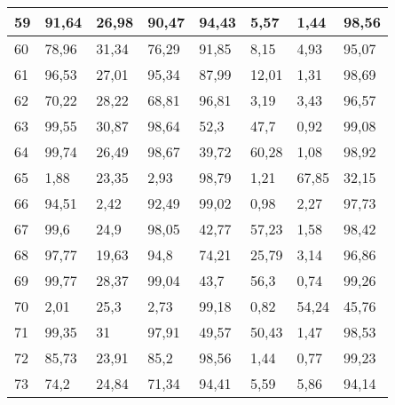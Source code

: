 \begin{longtable}[c]{|l|l|l|l|l|l|l|l|}
59              & 91,64        & 26,98        & 90,47       & 94,43         & 5,57          & 1,44          & 98,56         \\ \hline
60              & 78,96        & 31,34        & 76,29       & 91,85         & 8,15          & 4,93          & 95,07         \\ \hline
61              & 96,53        & 27,01        & 95,34       & 87,99         & 12,01         & 1,31          & 98,69         \\ \hline
62              & 70,22        & 28,22        & 68,81       & 96,81         & 3,19          & 3,43          & 96,57         \\ \hline
63              & 99,55        & 30,87        & 98,64       & 52,3          & 47,7          & 0,92          & 99,08         \\ \hline
64              & 99,74        & 26,49        & 98,67       & 39,72         & 60,28         & 1,08          & 98,92         \\ \hline
65              & 1,88         & 23,35        & 2,93        & 98,79         & 1,21          & 67,85         & 32,15         \\ \hline
66              & 94,51        & 2,42         & 92,49       & 99,02         & 0,98          & 2,27          & 97,73         \\ \hline
67              & 99,6         & 24,9         & 98,05       & 42,77         & 57,23         & 1,58          & 98,42         \\ \hline
68              & 97,77        & 19,63        & 94,8        & 74,21         & 25,79         & 3,14          & 96,86         \\ \hline
69              & 99,77        & 28,37        & 99,04       & 43,7          & 56,3          & 0,74          & 99,26         \\ \hline
70              & 2,01         & 25,3         & 2,73        & 99,18         & 0,82          & 54,24         & 45,76         \\ \hline
71              & 99,35        & 31           & 97,91       & 49,57         & 50,43         & 1,47          & 98,53         \\ \hline
72              & 85,73        & 23,91        & 85,2        & 98,56         & 1,44          & 0,77          & 99,23         \\ \hline
73              & 74,2         & 24,84        & 71,34       & 94,41         & 5,59          & 5,86          & 94,14         \\ \hline

\end{longtable}
